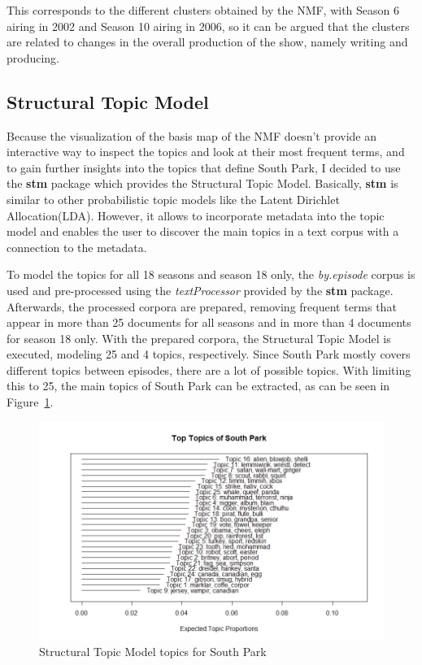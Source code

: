 \documentclass[10pt,a4paper]{article}
\begin{document}
	

	This corresponds to the different clusters obtained by the NMF, with Season 6 airing in 2002 and Season 10 airing in 2006, so it can be argued that the clusters are related to changes in the overall production of the show, namely writing and producing.
	
	\FloatBarrier
	\newpage
	\subsection{Structural Topic Model}
	Because the visualization of the basis map of the NMF doesn't provide an interactive way to inspect the topics and look at their most frequent terms, and to gain further insights into the topics that define South Park, I decided to use the \textbf{stm} package which provides the Structural Topic Model. Basically, \textbf{stm} is similar to other probabilistic topic models like the Latent Dirichlet Allocation(LDA). However, it allows to incorporate metadata into the topic model and enables the user to discover the main topics in a text corpus with a connection to the metadata. 
	
	To model the topics for all 18 seasons and season 18 only, the \textit{by.episode} corpus is used and pre-processed using the \textit{textProcessor} provided by the \textbf{stm} package. 
	Afterwards, the processed corpora are prepared, removing frequent terms that appear in more than 25 documents for all seasons and in more than 4 documents for season 18 only.
	With the prepared corpora, the Structural Topic Model is executed, modeling 25 and 4 topics, respectively. Since South Park mostly covers different topics between episodes, there are a lot of possible topics. With limiting this to 25, the main topics of South Park can be extracted, as can be seen in Figure~\ref{fig:stmAll}.
	
	\begin{figure}[h]
	\centering
	\includegraphics[scale=0.55]{images/TopicsAll.png}
	\caption{Structural Topic Model topics for South Park }
	\label{fig:stmAll}
	\end{figure}
	
\end{document}
